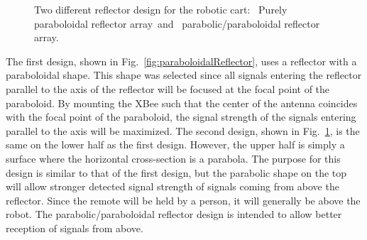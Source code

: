 \documentclass[conference]{IEEEtran}
\begin{document}
\begin{figure}[htbp]
\begin{subfigure}[b]{0.45\linewidth}
    \caption{}
    \label{fig:parabolicReflector}
  \end{subfigure}
  \caption[Reflector designs]{Two different reflector design for the robotic cart:~ Purely paraboloidal reflector array~and~ parabolic/paraboloidal reflector array.}
  \label{fig:reflectorDesigns}
\end{figure}
%

The first design, shown in Fig.~\ref{fig:paraboloidalReflector}, uses a
reflector with a paraboloidal shape. This shape was selected since all signals
entering the reflector parallel to the axis of the reflector will be focused at
the focal point of the paraboloid. By mounting the XBee such that the center of
the antenna coincides with the focal point of the paraboloid, the signal
strength of the signals entering parallel to the axis will be maximized. The
second design, shown in Fig.~\ref{fig:parabolicReflector}, is the same on the
lower half as the first design. However, the upper half is simply a surface
where the horizontal cross-section is a parabola. The purpose for this design is
similar to that of the first design, but the parabolic shape on the top will
allow stronger detected signal strength of signals coming from above the
reflector. Since the remote will be held by a person, it will generally be above
the robot. The parabolic/paraboloidal reflector design is intended to allow
better reception of signals from above.
\end{document}
